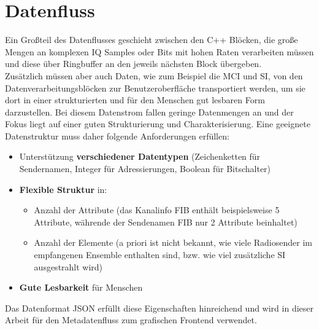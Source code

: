 \section{Datenfluss}
Ein Großteil des Datenflusses geschieht zwischen den C++ Blöcken, die große Mengen an komplexen IQ Samples oder Bits mit hohen Raten verarbeiten müssen und diese über Ringbuffer an den jeweils nächsten Block übergeben. \\
Zusätzlich müssen aber auch Daten, wie zum Beispiel die MCI und SI, von den Datenverarbeitungsblöcken zur Benutzeroberfläche transportiert werden, um sie dort in einer strukturierten und für den Menschen gut lesbaren Form darzustellen. Bei diesem Datenstrom fallen geringe Datenmengen an und der Fokus liegt auf einer guten Strukturierung und Charakterisierung.
Eine geeignete Datenstruktur muss daher folgende Anforderungen erfüllen:
\begin{itemize}
\item Unterstützung \textbf{verschiedener Datentypen} (Zeichenketten für Sendernamen, Integer für Adressierungen, Boolean für Bitschalter)
\item \textbf{Flexible Struktur} in:
\begin{itemize}
\item Anzahl der Attribute (das Kanalinfo FIB enthält beispielsweise 5 Attribute, währende der Sendenamen FIB nur 2 Attribute beinhaltet)
\item Anzahl der Elemente (a priori ist nicht bekannt, wie viele Radiosender im empfangenen Ensemble enthalten sind, bzw. wie viel zusätzliche SI ausgestrahlt wird)
\end{itemize}
\item \textbf{Gute Lesbarkeit} für Menschen
\end{itemize}
Das Datenformat \ac{JSON} erfüllt diese Eigenschaften hinreichend und wird in dieser Arbeit für den Metadatenfluss zum grafischen Frontend verwendet.
